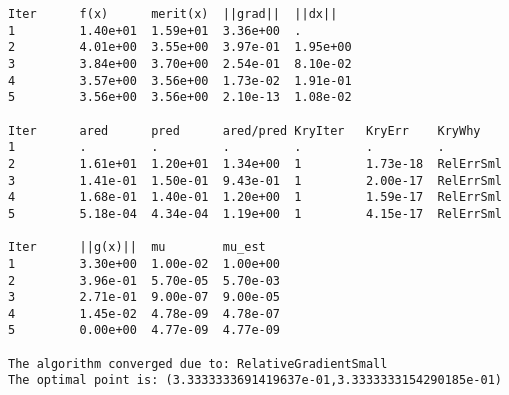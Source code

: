 \begin{lstlisting}[style=OptizelleOutput,caption={Output generated by Optizelle when running the simple constrained example.  We explain this output in Chapter \ref{ch:Output}.},label=lst:simpleConOut]
Iter      f(x)      merit(x)  ||grad||  ||dx||    
1         1.40e+01  1.59e+01  3.36e+00  .         
2         4.01e+00  3.55e+00  3.97e-01  1.95e+00  
3         3.84e+00  3.70e+00  2.54e-01  8.10e-02  
4         3.57e+00  3.56e+00  1.73e-02  1.91e-01  
5         3.56e+00  3.56e+00  2.10e-13  1.08e-02 
                    
Iter      ared      pred      ared/pred KryIter   KryErr    KryWhy    
1         .         .         .         .         .         .         
2         1.61e+01  1.20e+01  1.34e+00  1         1.73e-18  RelErrSml 
3         1.41e-01  1.50e-01  9.43e-01  1         2.00e-17  RelErrSml 
4         1.68e-01  1.40e-01  1.20e+00  1         1.59e-17  RelErrSml 
5         5.18e-04  4.34e-04  1.19e+00  1         4.15e-17  RelErrSml
                    
Iter      ||g(x)||  mu        mu_est    
1         3.30e+00  1.00e-02  1.00e+00  
2         3.96e-01  5.70e-05  5.70e-03  
3         2.71e-01  9.00e-07  9.00e-05  
4         1.45e-02  4.78e-09  4.78e-07  
5         0.00e+00  4.77e-09  4.77e-09  

The algorithm converged due to: RelativeGradientSmall
The optimal point is: (3.3333333691419637e-01,3.3333333154290185e-01)
\end{lstlisting}
